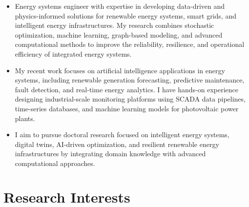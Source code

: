 \documentclass[letter,20pt]{article}
\begin{document}
\begin{justify}

\begin{itemize}
[
noitemsep,
topsep=5pt,
leftmargin=3ex,
rightmargin=1ex
]

\item
Energy systems engineer with expertise in developing data-driven and physics-informed solutions for renewable energy systems, smart grids, and intelligent energy infrastructures. My research combines stochastic optimization, machine learning, graph-based modeling, and advanced computational methods to improve the reliability, resilience, and operational efficiency of integrated energy systems.

\item
My recent work focuses on artificial intelligence applications in energy systems, including renewable generation forecasting, predictive maintenance, fault detection, and real-time energy analytics. I have hands-on experience designing industrial-scale monitoring platforms using SCADA data pipelines, time-series databases, and machine learning models for photovoltaic power plants.

\item
I aim to pursue doctoral research focused on intelligent energy systems, digital twins, AI-driven optimization, and resilient renewable energy infrastructures by integrating domain knowledge with advanced computational approaches.

\end{itemize}

\end{justify}




\section{\textbf{Research Interests}}

\vspace{5pt}
\end{document}
